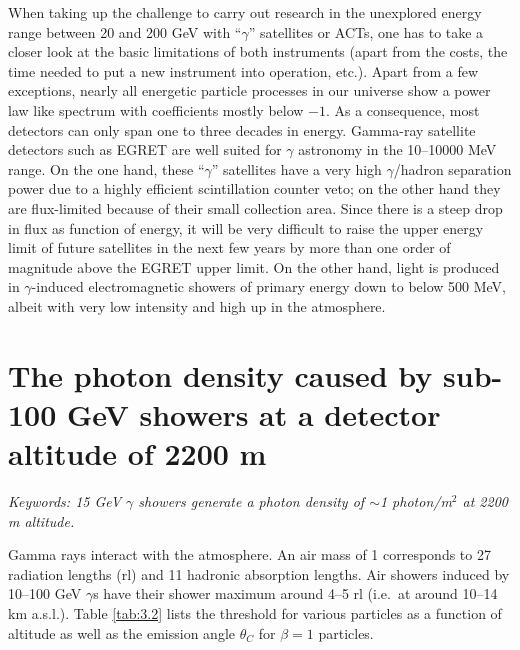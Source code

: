 When taking up the challenge to carry out research in the 
unexplored energy range between 
20 and 200 GeV with ``$\gamma$'' satellites or ACTs, one has to take
a closer look at the basic 
limitations of both instruments (apart from the costs, the time
needed to 
put a new instrument into operation, etc.).
Apart from a few exceptions, nearly all energetic particle processes 
in our universe show a power 
law like spectrum with coefficients mostly below $-1$. 
As a consequence, most detectors can 
only span one to three decades in energy. Gamma-ray 
satellite detectors such as 
EGRET are well suited for $\gamma$ astronomy in the 10--10000 MeV 
range. On the one hand, these ``$\gamma$'' 
satellites have a very high $\gamma$/hadron separation power due to a
highly efficient scintillation counter 
veto; on the other hand they are flux-limited because of
their small collection area. Since there is a
steep drop in flux as function of energy, it will be very difficult
to raise the upper energy limit 
of future satellites in the next few years by more than
one order of magnitude above the 
EGRET upper limit. On the other hand, \Cerenkov light
is produced in $\gamma$-induced 
electromagnetic showers of primary energy down to below 500 MeV, albeit
with very low intensity and high up 
in the atmosphere.


\section{The \Cerenkov photon density caused by sub-100 GeV showers at a
 detector altitude of 2200 m}
\par\medskip
{\it Keywords: 15 GeV $\gamma$ showers generate a photon density of 
$\sim$1 photon/m$^2$ at 2200 m altitude.}

\par\medskip Gamma rays interact with the atmosphere. An air mass of 1
corresponds to 27 radiation lengths (rl) 
and 11 hadronic absorption lengths. Air showers induced
by 10--100 GeV $\gamma$s have their shower 
maximum around 4--5 rl (i.e.\ at around 10--14 km a.s.l.).
Table \ref{tab:3.2} lists the \Cerenkov threshold 
for various particles as a function of altitude as well
as the \Cerenkov emission angle $\theta_C$ for $\beta = 1$ 
particles. 

